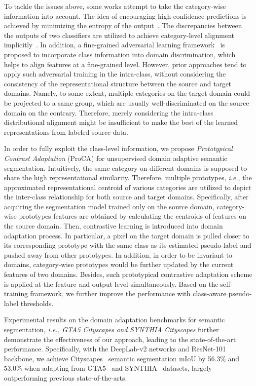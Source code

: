 \documentclass[runningheads]{llncs}
\begin{document}
To tackle the issues above, some works attempt to take the category-wise information into account. The idea of encouraging high-confidence predictions is achieved by minimizing the entropy of the output~\cite{vu2019advent}. The discrepancies between the outputs of two classifiers are utilized to achieve category-level alignment implicitly~\cite{luo2019taking}. In addition, a fine-grained adversarial learning framework~\cite{wang2020classes} is proposed to incorporate class information into domain discrimination, which helps to align features at a fine-grained level. However, prior approaches tend to apply such adversarial training in the intra-class, without considering the consistency of the representational structure between the source and target domains. Namely, to some extent, multiple categories on the target domain could be projected to a same group, which are usually well-discriminated on the source domain on the contrary. Therefore, merely considering the intra-class distributional alignment might be insufficient to 
make the best of the learned representations from labeled source data.



In order to fully exploit the class-level information, we propose \emph{Prototypical Contrast Adaptation} (ProCA) for unsupervised domain adaptive semantic segmentation. 
Intuitively, the same category on different domains is supposed to share the high representational similarity. Therefore, multiple prototypes, \emph{i.e.}, the approximated representational centroid of various categories are utilized to depict the inter-class relationship for both source and target domains. 
Specifically, after acquiring the segmentation model trained only on the source domain, category-wise prototypes features are obtained by calculating the centroids of features on the source domain. Then, contrastive learning is introduced into domain adaptation process. In particular, a pixel on the target domain is pulled closer to its corresponding prototype with the same class as its estimated pseudo-label and pushed away from other prototypes. In addition, in order to be invariant to domains, category-wise prototypes would be further updated by the current features of two domains. Besides, such prototypical contrastive adaptation scheme is applied at the feature and output level simultaneously. Based on the self-training framework, we further improve the performance with class-aware pseudo-label thresholds. 


Experimental results on the domain adaptation benchmarks for semantic segmentation, {\em i.e., GTA5  Cityscapes and SYNTHIA  Cityscapes} further demonstrate the effectiveness of our approach, leading to the state-of-the-art performance. Specifically, with the DeepLab-v2 networks and ResNet-101 backbone, we achieve Cityscapes~\cite{cordts2016cityscapes} semantic segmentation mIoU by 56.3\% and 53.0\% when adapting from GTA5~\cite{richter2016playing} and SYNTHIA~\cite{ros2016synthia} datasets, largely outperforming previous state-of-the-arts.
\end{document}
